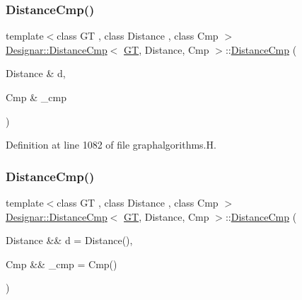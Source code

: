 \subsubsection{\texorpdfstring{Distance\+Cmp()}{DistanceCmp()}\hspace{0.1cm}{\footnotesize\ttfamily [1/2]}}
{\footnotesize\ttfamily template$<$class GT , class Distance , class Cmp $>$ \\
\hyperlink{class_designar_1_1_distance_cmp}{Designar\+::\+Distance\+Cmp}$<$ \hyperlink{demo-buildgraph_8_c_a3001c40d2c31ca87ed96cd7d1334a55e}{GT}, Distance, Cmp $>$\+::\hyperlink{class_designar_1_1_distance_cmp}{Distance\+Cmp} (\begin{DoxyParamCaption}\item[{Distance \&}]{d,  }\item[{Cmp \&}]{\+\_\+cmp }\end{DoxyParamCaption})\hspace{0.3cm}{\ttfamily [inline]}}



Definition at line 1082 of file graphalgorithms.\+H.

\mbox{\label{class_designar_1_1_distance_cmp_a1b9bedd922fc3007038b63fe19bfd10e}} 
\subsubsection{\texorpdfstring{Distance\+Cmp()}{DistanceCmp()}\hspace{0.1cm}{\footnotesize\ttfamily [2/2]}}
{\footnotesize\ttfamily template$<$class GT , class Distance , class Cmp $>$ \\
\hyperlink{class_designar_1_1_distance_cmp}{Designar\+::\+Distance\+Cmp}$<$ \hyperlink{demo-buildgraph_8_c_a3001c40d2c31ca87ed96cd7d1334a55e}{GT}, Distance, Cmp $>$\+::\hyperlink{class_designar_1_1_distance_cmp}{Distance\+Cmp} (\begin{DoxyParamCaption}\item[{Distance \&\&}]{d = {\ttfamily Distance()},  }\item[{Cmp \&\&}]{\+\_\+cmp = {\ttfamily Cmp()} }\end{DoxyParamCaption})\hspace{0.3cm}{\ttfamily [inline]}}




